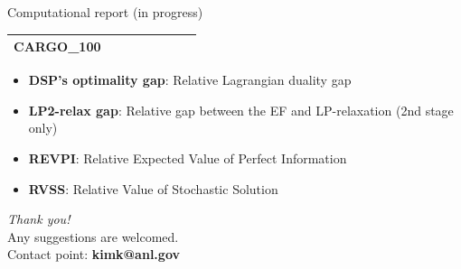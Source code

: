 \documentclass[usenames,dvipsnames]{beamer}
\begin{document}
\begin{frame}{Computational report (in progress)}
\begin{table}[H]
{\begin{tabular}{|l|ll|ll|l|l|l|}
CARGO\_100                     &                                 &                                &                                  &                                 &                                    &                            &                            \\ \hline	
\end{tabular}%
}
\end{table}
\begin{itemize}
\item \textbf{DSP's optimality gap}: Relative Lagrangian duality gap
\item \textbf{LP2-relax gap}: Relative gap between the EF and LP-relaxation (2nd stage only)
\item \textbf{REVPI}: Relative Expected Value of Perfect Information
\item \textbf{RVSS}: Relative Value of Stochastic Solution
\end{itemize}
\end{frame}

\begin{frame}{}
\centering \Huge
\emph{Thank you!}\\
\vspace{0.5cm}
\small
Any suggestions are welcomed.\\
\vspace{0.5cm}
Contact point: \textbf{kimk@anl.gov}
\end{frame}
\end{document}
